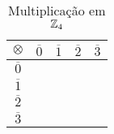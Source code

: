 \documentclass{beamer}
\begin{document}
    \begin{frame}
        \begin{exemplo}
                \begin{table}[!htb]
                  \caption{Multiplica\c{c}\~ao em $\mathbb{Z}_4$}
                  \begin{minipage}{.5\linewidth}
                  \centering
                    \begin{tabular}{|c|c|c|c|c|} 
                      \hline
                      $\otimes$ & $\overline{0}$ & $\overline{1}$ & $\overline{2}$ & $\overline{3}$\T\\
                      \hline
                      $\overline{0}$ & \phantom{abc} & \phantom{abc} & \phantom{abc} & \phantom{abc}\T\\
                      \hline
                      $\overline{1}$ & \phantom{abc} & \phantom{abc} & \phantom{abc} & \phantom{abc}\T\\
                      \hline
                      $\overline{2}$ & \phantom{abc} & \phantom{abc} & \phantom{abc} & \phantom{abc}\T\\
                      \hline
                      $\overline{3}$ & \phantom{abc} & \phantom{abc} & \phantom{abc} & \phantom{abc}\T\\
                      \hline
                    \end{tabular}
                \end{minipage}
            \end{table}
        \end{exemplo}
    \end{frame}
\end{document}
